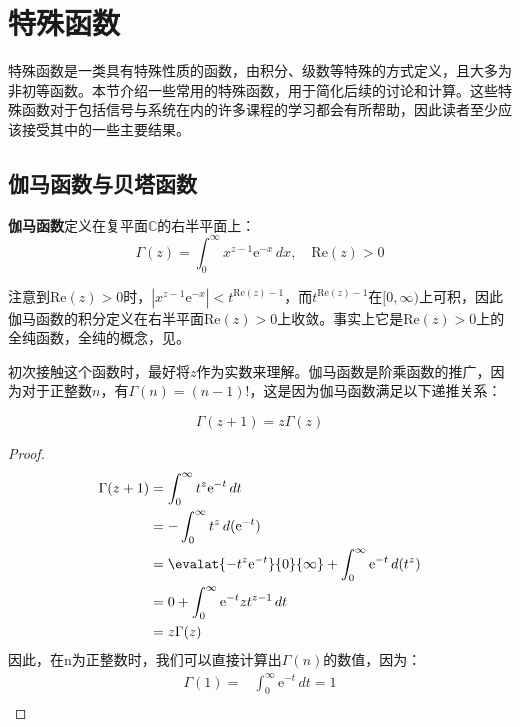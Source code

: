 \section{特殊函数}\label{sec:special_function}

特殊函数是一类具有特殊性质的函数，由积分、级数等特殊的方式定义，且大多为非初等函数。本节介绍一些常用的特殊函数，用于简化后续的讨论和计算。这些特殊函数对于包括信号与系统在内的许多课程的学习都会有所帮助，因此读者至少应该接受其中的一些主要结果。

\subsection{伽马函数与贝塔函数}\label{sub:Gamma}

\begin{definition}
    \textbf{伽马函数}定义在复平面$\mathbb{C}$的右半平面上：
    \[\Gamma (z)=\int_{0}^{\infty}x^{z-1}\mathrm{e}^{-x}\,dx,\quad\mathrm{Re}(z)>0\]
\end{definition}
注意到$\mathrm{Re}(z)>0$时，$|x^{z-1}\mathrm{e}^{-x}|<t^{\mathrm{Re}(z)-1}$，而$t^{\mathrm{Re}(z)-1}$在$[0,\infty)$上可积，因此伽马函数的积分定义在右半平面$\mathrm{Re}(z)>0$上收敛。事实上它是$\mathrm{Re}(z)>0$上的全纯函数，全纯的概念，见。

初次接触这个函数时，最好将$z$作为实数来理解。伽马函数是阶乘函数的推广，因为对于正整数$n$，有$\Gamma (n)=(n-1)!$，这是因为伽马函数满足以下递推关系：
\begin{theorem}
    \[\Gamma (z+1)=z\Gamma (z)\]
\end{theorem}
\begin{proof}
    \begin{align*}
    \Gamma (z+1)&=\int_{0}^{\infty}t^{z}\mathrm{e}^{-t}\,dt\\
                &=-\int_{0}^{\infty}t^{z}\,d(\mathrm{e}^{-t})\\
                &=\evalat{-t^{z}\mathrm{e}^{-t}}{0}{\infty}+\int_{0}^{\infty}\mathrm{e}^{-t}\,d(t^{z})\\
                &=0+\int_{0}^{\infty}\mathrm{e}^{-t}zt^{z-1}\,dt\\
                &=z\Gamma (z)
    \end{align*}
    因此，在n为正整数时，我们可以直接计算出$\Gamma(n)$的数值，因为：
    \begin{align*}
        \Gamma(1)=&\int_{0}^{\infty}\mathrm{e}^{-t}\,dt=1\\
    \end{align*}
\end{proof}

